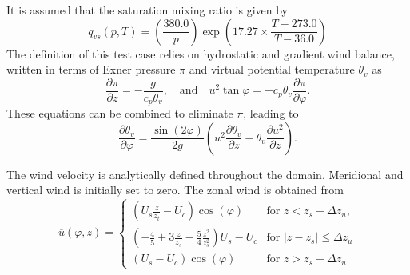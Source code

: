 \documentclass[times,doublespace]{fldauth}
\newcommand{\pdiff}[2]{\frac{\partial #1}{\partial #2}}
\begin{document}
{\begin{table}[h]
\end{table}

It is assumed that the saturation mixing ratio is given by
\begin{equation}
q_{vs}(p,T) = \left( \frac{380.0}{p} \right) \exp\left(17.27 \times \frac{T-273.0}{T-36.0}\right)
\end {equation}  The definition of this test case relies on hydrostatic and gradient wind balance, written in terms of Exner pressure $\pi$ and virtual potential temperature $\theta_v$ as
\begin{equation} \label{eq:BalanceEq}
\pdiff{\pi}{z} = - \frac{g}{c_p \theta_v}, \quad \mbox{and} \quad u^2 \tan \varphi = - c_p \theta_v \pdiff{\pi}{\varphi}.
\end{equation}  These equations can be combined to eliminate $\pi$, leading to
\begin{equation} \label{eq:CombinedBalanceEq}
\pdiff{\theta_v}{\varphi} = \frac{\sin (2 \varphi)}{2 g} \left( u^2 \pdiff{\theta_v}{z} - \theta_v \pdiff{u^2}{z} \right).
\end{equation}

The wind velocity is analytically defined throughout the domain.  Meridional and vertical wind is initially set to zero.  The zonal wind is obtained from
\begin{equation}
\overline{u}(\varphi,z) = \left\{ \begin{array}{ll}
\displaystyle \left(U_s\frac{z}{z_t}-U_c\right)\cos(\varphi) & \mbox{for $z < z_s - \Delta z_u$}, \\[2.0ex]
\displaystyle \left(-\frac{4}{5}+3\frac{z}{z_s}-\frac{5}{4}\frac{z^2}{z_s^2}\right)U_s-U_c & \mbox{for $\vert z-z_s \vert \leq \Delta z_u$} \\[2.0ex]
\displaystyle \left(U_s-U_c\right)\cos(\varphi) & \mbox{for $z > z_s + \Delta z_u$}
\end{array} \right.
\end{equation}

}
\end{document}
